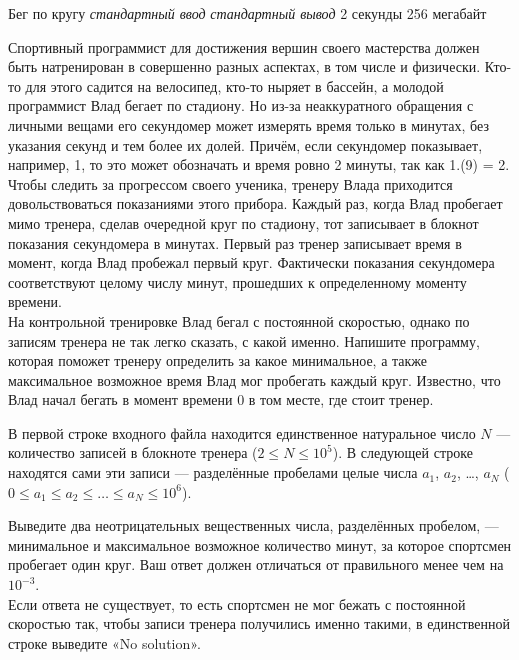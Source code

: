 \begin{problem}%
{Бег по кругу}%
{\textsl{стандартный ввод}}%
{\textsl{стандартный вывод}}%
{2 секунды}%
{256 мегабайт}{}

Спортивный программист для достижения вершин своего мастерства должен быть натренирован в совершенно разных аспектах, в том числе и физически. Кто-то для этого садится на велосипед, кто-то ныряет в бассейн, а молодой программист Влад бегает по стадиону. Но из-за неаккуратного обращения с личными вещами его секундомер может измерять время только в минутах, без указания секунд и тем более их долей. Причём, если секундомер показывает, например, 1, то это может обозначать и время ровно 2 минуты, так как 1.(9) = 2.\\

Чтобы следить за прогрессом своего ученика, тренеру Влада приходится довольствоваться показаниями этого прибора. Каждый раз, когда Влад пробегает мимо тренера, сделав очередной круг по стадиону, тот записывает в блокнот показания секундомера в минутах. Первый раз тренер записывает время в момент, когда Влад пробежал первый круг. Фактически показания секундомера соответствуют целому числу минут, прошедших к определенному моменту времени.\\

На контрольной тренировке Влад бегал с постоянной скоростью, однако по записям тренера не так легко сказать, с какой именно. Напишите программу, которая поможет тренеру определить за какое минимальное, а также максимальное возможное время Влад мог пробегать каждый круг. Известно, что Влад начал бегать в момент времени 0 в том месте, где стоит тренер.

\InputFile

В первой строке входного файла находится единственное натуральное число $N$ — количество записей в блокноте тренера ($2 \le N \le 10^5$). В следующей строке находятся сами эти записи — разделённые пробелами целые числа $a_1$, $a_2$, \dots, $a_N$ ($0 \le a_1 \le a_2 \le \dots \le a_N \le 10^6$).

\OutputFile

Выведите два неотрицательных вещественных числа, разделённых пробелом, — минимальное и максимальное возможное количество минут, за которое спортсмен пробегает один круг. Ваш ответ должен отличаться от правильного менее чем на $10^{-3}$.\\

Если ответа не существует, то есть спортсмен не мог бежать с постоянной скоростью так, чтобы записи тренера получились именно такими, в единственной строке выведите «No solution».


\end{problem}
